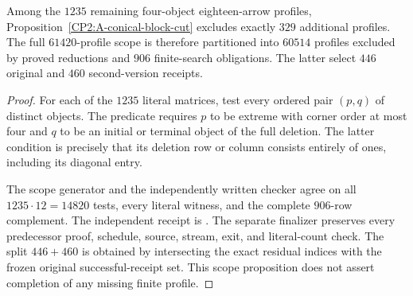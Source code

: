 \begin{proposition}
\label{CP2:A-four-eighteen-conical-scope}
Among the $1235$ remaining four-object eighteen-arrow
profiles, Proposition~\ref{CP2:A-conical-block-cut}
excludes exactly $329$ additional profiles.  The full
$61420$-profile scope is therefore partitioned into
$60514$ profiles excluded by proved reductions and
$906$ finite-search obligations.  The latter select
$446$ original and $460$ second-version receipts.
\end{proposition}
\begin{proof}
For each of the $1235$ literal matrices, test every
ordered pair $(p,q)$ of distinct objects.  The predicate
requires $p$ to be extreme with corner order at most
four and $q$ to be an initial or terminal object of
the full deletion.  The latter condition is precisely
that its deletion row or column consists entirely of
ones, including its diagonal entry.

The scope generator
and the independently written checker
agree on all $1235\cdot12=14820$ tests, every literal
witness, and the complete $906$-row complement.  The
independent receipt is
.
The separate finalizer
preserves every predecessor proof, schedule, source,
stream, exit, and literal-count check.  The split
$446+460$ is obtained by intersecting the exact residual
indices with the frozen original successful-receipt set.
This scope proposition does not assert completion of
any missing finite profile.
\end{proof}
